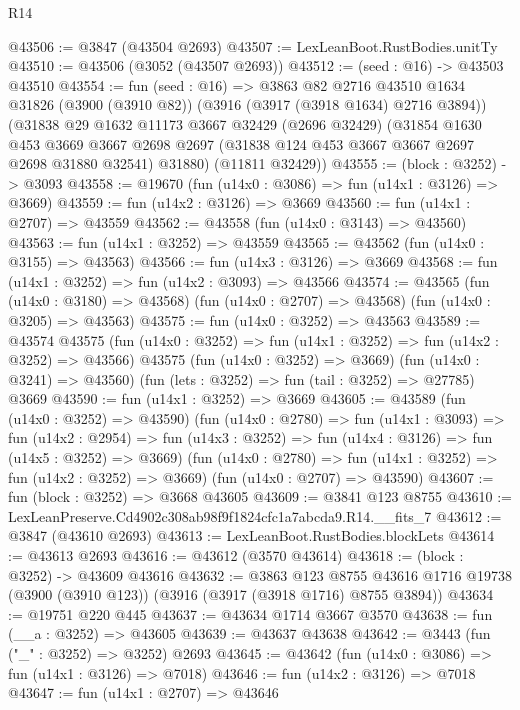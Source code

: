 \begin{lexlean}{R14}
\begin{coremodule}
@43506 := @3847 (@43504 @2693)
@43507 := LexLeanBoot.RustBodies.unitTy
@43510 := @43506 (@3052 (@43507 @2693))
@43512 := (seed : @16) -> @43503 @43510
@43554 := fun (seed : @16) =>
  @3863
    @82
    @2716
    @43510
    @1634
    @31826
    (@3900 (@3910 @82))
    (@3916 (@3917 (@3918 @1634) @2716 @3894))
    (@31838
      @29
      @1632
      @11173
      @3667
      @32429
      (@2696 @32429)
      (@31854
        @1630
        @453
        @3669
        @3667
        @2698
        @2697
        (@31838 @124 @453 @3667 @3667 @2697 @2698 @31880 @32541)
        @31880)
      (@11811 @32429))
@43555 := (block : @3252) -> @3093
@43558 := @19670 (fun (u14x0 : @3086) => fun (u14x1 : @3126) => @3669)
@43559 := fun (u14x2 : @3126) => @3669
@43560 := fun (u14x1 : @2707) => @43559
@43562 := @43558 (fun (u14x0 : @3143) => @43560)
@43563 := fun (u14x1 : @3252) => @43559
@43565 := @43562 (fun (u14x0 : @3155) => @43563)
@43566 := fun (u14x3 : @3126) => @3669
@43568 := fun (u14x1 : @3252) => fun (u14x2 : @3093) => @43566
@43574 := @43565
    (fun (u14x0 : @3180) => @43568)
    (fun (u14x0 : @2707) => @43568)
    (fun (u14x0 : @3205) => @43563)
@43575 := fun (u14x0 : @3252) => @43563
@43589 := @43574
    @43575
    (fun (u14x0 : @3252) => fun (u14x1 : @3252) => fun (u14x2 : @3252) => @43566)
    @43575
    (fun (u14x0 : @3252) => @3669)
    (fun (u14x0 : @3241) => @43560)
    (fun (lets : @3252) => fun (tail : @3252) => @27785)
    @3669
@43590 := fun (u14x1 : @3252) => @3669
@43605 := @43589
    (fun (u14x0 : @3252) => @43590)
    (fun (u14x0 : @2780) =>
    fun (u14x1 : @3093) =>
    fun (u14x2 : @2954) =>
    fun (u14x3 : @3252) => fun (u14x4 : @3126) => fun (u14x5 : @3252) => @3669)
    (fun (u14x0 : @2780) => fun (u14x1 : @3252) => fun (u14x2 : @3252) => @3669)
    (fun (u14x0 : @2707) => @43590)
@43607 := fun (block : @3252) => @3668 @43605
@43609 := @3841 @123 @8755
@43610 := LexLeanPreserve.Cd4902c308ab98f9f1824cfc1a7abcda9.R14.__fits_7
@43612 := @3847 (@43610 @2693)
@43613 := LexLeanBoot.RustBodies.blockLets
@43614 := @43613 @2693
@43616 := @43612 (@3570 @43614)
@43618 := (block : @3252) -> @43609 @43616
@43632 := @3863
    @123
    @8755
    @43616
    @1716
    @19738
    (@3900 (@3910 @123))
    (@3916 (@3917 (@3918 @1716) @8755 @3894))
@43634 := @19751 @220 @445
@43637 := @43634 @1714 @3667 @3570
@43638 := fun (__a : @3252) => @43605
@43639 := @43637 @43638
@43642 := @3443 (fun ("_" : @3252) => @3252) @2693
@43645 := @43642 (fun (u14x0 : @3086) => fun (u14x1 : @3126) => @7018)
@43646 := fun (u14x2 : @3126) => @7018
@43647 := fun (u14x1 : @2707) => @43646

\end{coremodule}
\end{lexlean}
